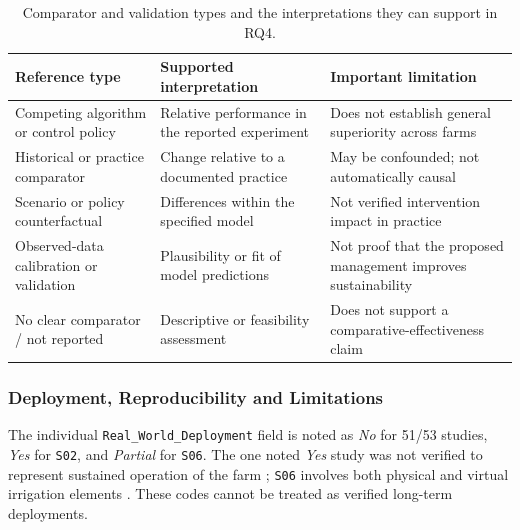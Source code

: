 \documentclass[11pt,a4paper]{article}
\begin{document}
\begin{table}[htbp]
\centering
\scriptsize

\caption{Comparator and validation types and the
interpretations they can support in RQ4.}

\label{tab:rq4_comparator_interpretation}

\begin{tabularx}{\textwidth}{@{}XXX@{}}
\toprule

\textbf{Reference type} &
\textbf{Supported interpretation} &
\textbf{Important limitation} \\

\midrule

Competing algorithm or control policy &
Relative performance in the reported experiment &
Does not establish general superiority across farms \\

Historical or practice comparator &
Change relative to a documented practice &
May be confounded; not automatically causal \\

Scenario or policy counterfactual &
Differences within the specified model &
Not verified intervention impact in practice \\

Observed-data calibration or validation &
Plausibility or fit of model predictions &
Not proof that the proposed management improves sustainability \\

No clear comparator / not reported &
Descriptive or feasibility assessment &
Does not support a comparative-effectiveness claim \\

\bottomrule
\end{tabularx}
\end{table}

\subsubsection{Deployment, Reproducibility and Limitations}

The individual \texttt{Real\_World\_Deployment} field is noted
as \emph{No} for 51/53 studies, \emph{Yes} for \texttt{S02}, and
\emph{Partial} for \texttt{S06}. The one noted \emph{Yes} study
was not verified to represent sustained operation of the farm
\parencite{skobelev_smart_2019}; \texttt{S06} involves both physical
and virtual irrigation elements
\parencite{jimenez_intelligent_2022}. These codes cannot be treated
as verified long-term deployments.
\end{document}
